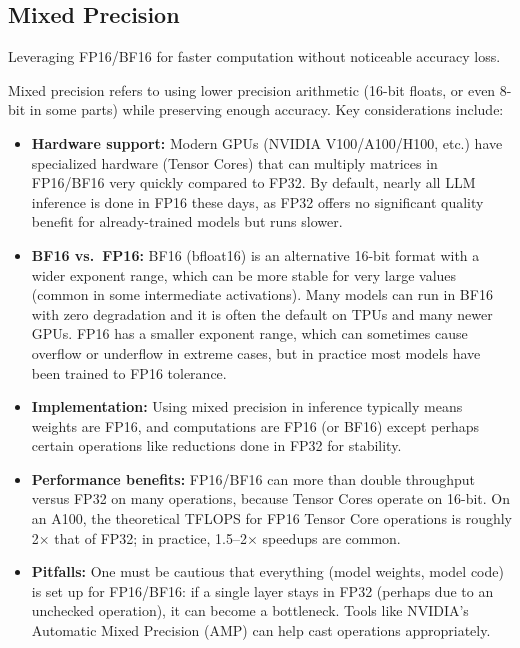 \subsection{Mixed Precision}
Leveraging FP16/BF16 for faster computation without noticeable accuracy loss.

Mixed precision refers to using lower precision arithmetic (16-bit floats, or even 8-bit in some parts) while preserving enough accuracy. Key considerations include:

\begin{tcolorbox}[
  title={\textbf{Mixed Precision Considerations}},
  colback=blue!5,
  colframe=blue!40!black,
  colbacktitle=blue!20,
  coltitle=black,
  fonttitle=\bfseries,
  boxrule=0.7pt,
  arc=4pt,
  left=5mm, right=5mm, top=4mm, bottom=4mm,
  before skip=6pt,
  after skip=6pt
]
\begin{itemize}
\item \textbf{Hardware support:} Modern GPUs (NVIDIA V100/A100/H100, etc.) have specialized hardware (Tensor Cores) that can multiply matrices in FP16/BF16 very quickly compared to FP32. By default, nearly all LLM inference is done in FP16 these days, as FP32 offers no significant quality benefit for already-trained models but runs slower.

\item \textbf{BF16 vs.\ FP16:} BF16 (bfloat16) is an alternative 16-bit format with a wider exponent range, which can be more stable for very large values (common in some intermediate activations). Many models can run in BF16 with zero degradation and it is often the default on TPUs and many newer GPUs. FP16 has a smaller exponent range, which can sometimes cause overflow or underflow in extreme cases, but in practice most models have been trained to FP16 tolerance.

\item \textbf{Implementation:} Using mixed precision in inference typically means weights are FP16, and computations are FP16 (or BF16) except perhaps certain operations like reductions done in FP32 for stability.

\item \textbf{Performance benefits:} FP16/BF16 can more than double throughput versus FP32 on many operations, because Tensor Cores operate on 16-bit. On an A100, the theoretical TFLOPS for FP16 Tensor Core operations is roughly 2$\times$ that of FP32; in practice, 1.5--2$\times$ speedups are common.

\item \textbf{Pitfalls:} One must be cautious that everything (model weights, model code) is set up for FP16/BF16: if a single layer stays in FP32 (perhaps due to an unchecked operation), it can become a bottleneck. Tools like NVIDIA's Automatic Mixed Precision (AMP) can help cast operations appropriately.


\end{itemize}
\end{tcolorbox}
